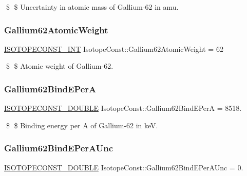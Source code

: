 \$ \$ Uncertainty in atomic mass of Gallium-\/62 in amu. \mbox{\label{group___isotope_const-_gallium-_ga62_ga0c9b208f0d1a336c0085e8176678790e}} 
\subsubsection{\texorpdfstring{Gallium62\+Atomic\+Weight}{Gallium62AtomicWeight}}
{\footnotesize\ttfamily \mbox{\hyperlink{group___isotope_const-_macros_ga5f18360b3e99483a35c32d789e62621c}{I\+S\+O\+T\+O\+P\+E\+C\+O\+N\+S\+T\+\_\+\+I\+NT}} Isotope\+Const\+::\+Gallium62\+Atomic\+Weight = 62}

\$ \$ Atomic weight of Gallium-\/62. \mbox{\label{group___isotope_const-_gallium-_ga62_gab0f1dfff67818a94e441cd0c7dc80a5a}} 
\subsubsection{\texorpdfstring{Gallium62\+Bind\+E\+PerA}{Gallium62BindEPerA}}
{\footnotesize\ttfamily \mbox{\hyperlink{group___isotope_const-_macros_ga8f45a7272ce02c0b4c65c44636ed719a}{I\+S\+O\+T\+O\+P\+E\+C\+O\+N\+S\+T\+\_\+\+D\+O\+U\+B\+LE}} Isotope\+Const\+::\+Gallium62\+Bind\+E\+PerA = 8518.}

\$ \$ Binding energy per A of Gallium-\/62 in keV. \mbox{\label{group___isotope_const-_gallium-_ga62_ga9a742893a63a605bd81169be6c1a2e44}} 
\subsubsection{\texorpdfstring{Gallium62\+Bind\+E\+Per\+A\+Unc}{Gallium62BindEPerAUnc}}
{\footnotesize\ttfamily \mbox{\hyperlink{group___isotope_const-_macros_ga8f45a7272ce02c0b4c65c44636ed719a}{I\+S\+O\+T\+O\+P\+E\+C\+O\+N\+S\+T\+\_\+\+D\+O\+U\+B\+LE}} Isotope\+Const\+::\+Gallium62\+Bind\+E\+Per\+A\+Unc = 0.}

